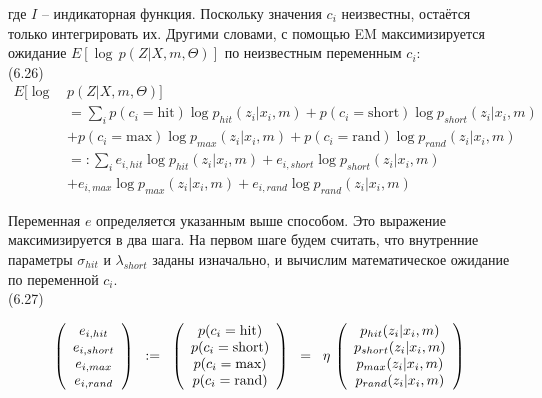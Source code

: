 \documentclass[10pt,a4paper]{article}
\begin{document}
где $I$ – индикаторная функция. Поскольку значения $c_i$ неизвестны, остаётся только интегрировать их. Другими словами, с помощью EM максимизируется ожидание $E[\log\, p(Z | X, m, \varTheta)]$ по неизвестным переменным $c_i$:\\

(6.26)
\begin{equation*}
\begin{split}
E[\log\, &p(Z|X,m,\varTheta)]\\
&=\sum_i p(c_i=\text{hit})\log p_{hit}(z_i|x_i,m)+p(c_i=\text{short})\log p_{short}(z_i|x_i,m)\\
&+p(c_i=\text{max})\log p_{max}(z_i|x_i,m)+p(c_i=\text{rand})\log p_{rand}(z_i|x_i,m)\\
&=:\sum_i e_{i,hit}\log p_{hit}(z_i|x_i,m)+e_{i,short}\log p_{short}(z_i|x_i,m)\\
&+e_{i,max}\log p_{max}(z_i|x_i,m)+e_{i,rand}\log p_{rand}(z_i|x_i,m)
\end{split}
\end{equation*}

Переменная $e$ определяется указанным выше способом. Это выражение максимизируется в два шага. На первом шаге будем считать, что внутренние параметры $\sigma_{hit}$ и $\lambda_{short}$ заданы изначально, и вычислим математическое ожидание по переменной $c_i$.\\

(6.27)
\begin{minipage}{0.3\textwidth}
\begin{equation*}
	\left(\begin{array}{c}
	e_{i,hit}\\
	e_{i,short}\\
	e_{i,max}\\
	e_{i,rand}\\
	\end{array}\right)
	\hspace{2mm}
	:=
	\hspace{2mm}
	\left(\begin{array}{c}
	p(c_i=\text{hit})\\
	p(c_i=\text{short})\\
	p(c_i=\text{max})\\
	p(c_i=\text{rand})\\
	\end{array}\right)
	\hspace{2mm}
	=
	\hspace{2mm}
	\eta\,
	\left(\begin{array}{c}
	p_{hit}(z_i|x_i,m)\\
	p_{short}(z_i|x_i,m)\\
	p_{max}(z_i|x_i,m)\\
	p_{rand}(z_i|x_i,m)\\
	\end{array}\right)
\end{equation*}
\end{minipage}
\end{document}

